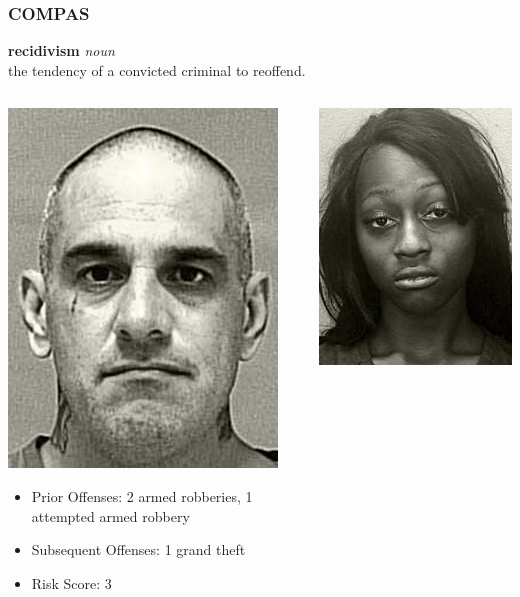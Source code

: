 \documentclass{beamer}
\begin{document}
\begin{frame}
    \frametitle{COMPAS}
    \textbf{recidivism} \textit{noun} \\
    \quad the tendency of a convicted criminal to reoffend.
    \begin{columns}[T]
        \begin{column}{.5\textwidth}
            \centering
            \includegraphics[width=.5\textwidth]{PRATER.jpg}
            \footnotesize
            \begin{itemize}
                \item Prior Offenses: 2 armed robberies, 1 attempted armed robbery
                \item Subsequent Offenses: 1 grand theft
                \item Risk Score: 3
            \end{itemize}
        \end{column}
        \begin{column}{.5\textwidth}
            \centering
            \includegraphics[width=.5\textwidth]{BORDEN.jpg}

\end{column}
\end{columns}
\end{frame}
\end{document}
